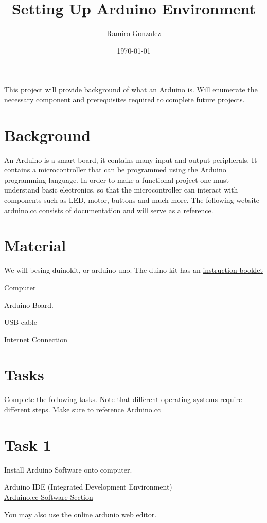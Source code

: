 \documentclass[12pt]{article}
\begin{document}
\title{Setting Up Arduino Environment}
\author{Ramiro Gonzalez}
\date{\today}

\maketitle

\begin{Objective}
	This project will provide background of what an Arduino is. Will enumerate the necessary component and prerequisites required to complete future projects.  
\end{Objective}

\section*{Background}
	An Arduino is a smart board, it contains many input and output peripherals. It contains a microcontroller that can be programmed using the Arduino programming language. In order to make a functional project one must understand basic electronics, so that the microcontroller can interact with components such as LED, motor, buttons and much more. The following website  \color{red} \href{www.arduino.cc}{arduino.cc} \color{black} consists of documentation and will serve as a reference. 
\section*{Material}
We will besing duinokit, or arduino uno. The duino kit has an \color{red} \href{https://drive.google.com/file/d/0B4XGOMubJWWralp1TlBEcnI4NnM/view?usp=sharing}{instruction booklet} \color{black}
\begin{todolist}
    \item Computer 
    \item Arduino Board.
    \item USB cable
    \item Internet Connection
\end{todolist}
\section{Tasks}
Complete the following tasks. Note that different operating systems require different steps. Make sure to reference \href{www.arduino.cc}{Arduino.cc}
\section*{Task 1}
Install Arduino Software onto computer. 
\begin{todolist}
	  \item Arduino IDE (Integrated Development Environment) \\
	  \color{red} 
	  \href{https://www.arduino.cc/en/Main/Software}{Arduino.cc Software Section}\color{black} 
	  \item You may also use the online ardunio web editor. 
\end{todolist}
\end{document}
